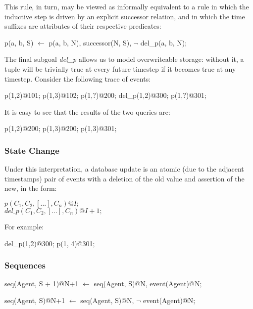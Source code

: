 This rule, in turn, may be viewed as informally equivalent to a rule in which the inductive step is driven by an 
explicit successor relation, and in which the time suffixes are attributes of their respective predicates:

\begin{Dedalus}
p(a, b, S) \(\leftarrow\)
  p(a, b, N),
  successor(N, S), 
  \(\lnot\) del\_p(a, b, N);
\end{Dedalus}

The final subgoal \emph{del\_p} allows us to model overwriteable storage: without it, a tuple will be trivially true at every future timestep if it becomes true
at any timestep.  Consider the following trace of events:

\begin{Dedalus}
p(1,2)@101;
p(1,3)@102;
p(1,?)@200;
del_p(1,2)@300;
p(1,?)@301;
\end{Dedalus}

It is easy to see that the results of the two queries are:


\begin{Dedalus}
p(1,2)@200;
p(1,3)@200;
p(1,3)@301;
\end{Dedalus}

\subsubsection{State Change}

Under this interpretation, a database update is an atomic (due to the adjacent timestamps)
pair of events with a deletion of the old value and assertion of the new, in the form:

$p(C_{1},C_{2},[...],C_{n})@I;$
\\
$del\_p(C_{1},C_{2},[...],C_{n})@I+1;$

For example:

\begin{Dedalus}
del\_p(1,2)@300; 
p(1, 4)@301;
\end{Dedalus}

\subsubsection{Sequences}

\begin{Dedalus}
seq(Agent, S + 1)@N+1 \(\leftarrow\)
  seq(Agent, S)@N, 
  event(Agent)@N; 
  
seq(Agent, S)@N+1 \(\leftarrow\) 
  seq(Agent, S)@N, 
  \(\lnot\) event(Agent)@N;
\end{Dedalus}

